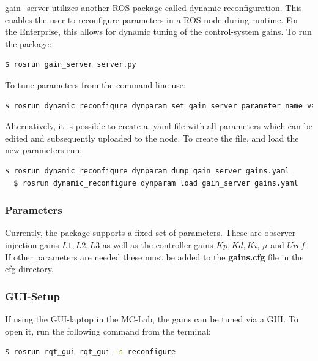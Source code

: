 gain\_server utilizes another ROS-package called dynamic reconfiguration. This enables the user to reconfigure parameters in a ROS-node during runtime. For the Enterprise, this allows for dynamic tuning of the control-system gains. To run the package: 

\begin{lstlisting}[language=bash,basicstyle=\mlttfamily, breaklines=true]
  $ rosrun gain_server server.py
\end{lstlisting}

To tune parameters from the command-line use: 

\begin{lstlisting}[language=bash,basicstyle=\mlttfamily, breaklines=true]
  $ rosrun dynamic_reconfigure dynparam set gain_server parameter_name value
\end{lstlisting}

Alternatively, it is possible to create a .yaml file with all parameters which can be edited and subsequently uploaded to the node. To create the file, and load the new parameters run: 

\begin{lstlisting}[language=bash,basicstyle=\mlttfamily, breaklines=true]
  $ rosrun dynamic_reconfigure dynparam dump gain_server gains.yaml
  $ rosrun dynamic_reconfigure dynparam load gain_server gains.yaml
\end{lstlisting}

\subsubsection{Parameters}

Currently, the package supports a fixed set of parameters. These are observer injection gains $L1, L2, L3$ as well as the controller gains $Kp, Kd, Ki$, $\mu$ and $Uref$. If other parameters are needed these must be added to the \textbf{gains.cfg} file in the cfg-directory. 

\subsubsection{GUI-Setup}

If using the GUI-laptop in the MC-Lab, the gains can be tuned via a GUI. To open it, run the following command from the terminal: 
\begin{lstlisting}[language=bash,basicstyle=\mlttfamily, breaklines=true]
  $ rosrun rqt_gui rqt_gui -s reconfigure
\end{lstlisting}

